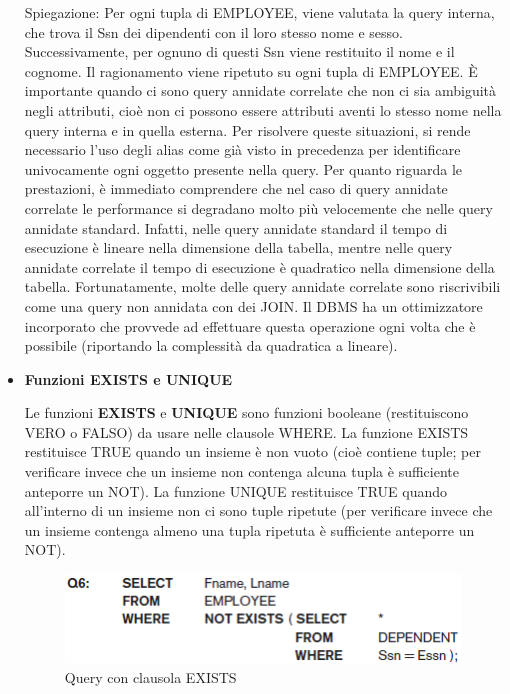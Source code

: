 \begin{itemize}
Spiegazione: Per ogni tupla di EMPLOYEE, viene valutata la query interna, che trova il Ssn dei dipendenti con il loro stesso nome e sesso. Successivamente, per ognuno di questi Ssn viene restituito il nome e il cognome. Il ragionamento viene ripetuto su ogni tupla di EMPLOYEE. È importante quando ci sono query annidate correlate che non ci sia ambiguità negli attributi, cioè non ci possono essere attributi aventi lo stesso nome nella query interna e in quella esterna. Per risolvere queste situazioni, si rende necessario l’uso degli alias come già visto in precedenza per identificare univocamente ogni oggetto presente nella query. Per quanto riguarda le prestazioni, è immediato comprendere che nel caso di query annidate correlate le performance si degradano molto più velocemente che nelle query annidate standard. Infatti, nelle query annidate standard il tempo di esecuzione è lineare nella dimensione della tabella, mentre nelle query annidate correlate il tempo di esecuzione è quadratico nella dimensione della tabella. Fortunatamente, molte delle query annidate correlate sono riscrivibili come una query non annidata con dei JOIN. Il DBMS ha un ottimizzatore incorporato che provvede ad effettuare questa operazione ogni volta che è possibile (riportando la complessità da quadratica a lineare).  


\item{\textbf{Funzioni EXISTS e UNIQUE}}

Le funzioni \textbf{EXISTS} e \textbf{UNIQUE} sono funzioni booleane (restituiscono VERO o FALSO) da usare nelle clausole WHERE. La funzione EXISTS restituisce TRUE quando un insieme è non vuoto (cioè contiene tuple; per verificare invece che un insieme non contenga alcuna tupla è sufficiente anteporre un NOT). La funzione UNIQUE restituisce TRUE quando all’interno di un insieme non ci sono tuple ripetute (per verificare invece che un insieme contenga almeno una tupla ripetuta è sufficiente anteporre un NOT). 

\begin{center}
\begin{figure}[H]
\centering
\includegraphics[scale=1]{figures/not_exists.png}
\caption{Query con clausola EXISTS} 
\end{figure}
\end{center}


\end{itemize}
